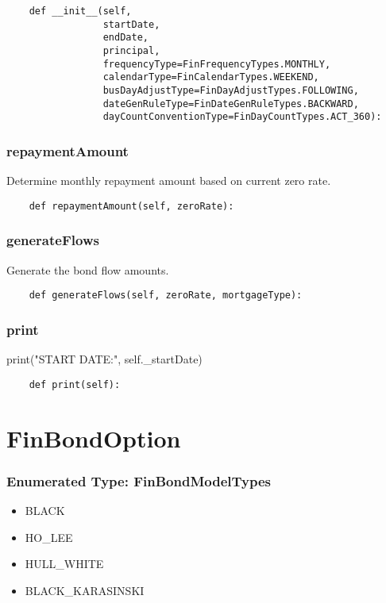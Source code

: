 \documentclass[twoside,11pt]{book}
\begin{document}
\begin{lstlisting}
    def __init__(self,
                 startDate,
                 endDate,
                 principal,
                 frequencyType=FinFrequencyTypes.MONTHLY,
                 calendarType=FinCalendarTypes.WEEKEND,
                 busDayAdjustType=FinDayAdjustTypes.FOLLOWING,
                 dateGenRuleType=FinDateGenRuleTypes.BACKWARD,
                 dayCountConventionType=FinDayCountTypes.ACT_360):
\end{lstlisting}

\subsubsection*{{\bf repaymentAmount}}
Determine monthly repayment amount based on current zero rate.  

\begin{lstlisting}
    def repaymentAmount(self, zeroRate):
\end{lstlisting}

\subsubsection*{{\bf generateFlows}}
Generate the bond flow amounts.  

\begin{lstlisting}
    def generateFlows(self, zeroRate, mortgageType):
\end{lstlisting}

\subsubsection*{{\bf print}}
print("START DATE:", self.\_startDate) 

\begin{lstlisting}
    def print(self):
\end{lstlisting}

\newpage
\section{FinBondOption}

\subsubsection{Enumerated Type: FinBondModelTypes}
\begin{itemize}
\item{BLACK}
\item{HO\_LEE}
\item{HULL\_WHITE}
\item{BLACK\_KARASINSKI}
\end{itemize}
\end{document}
